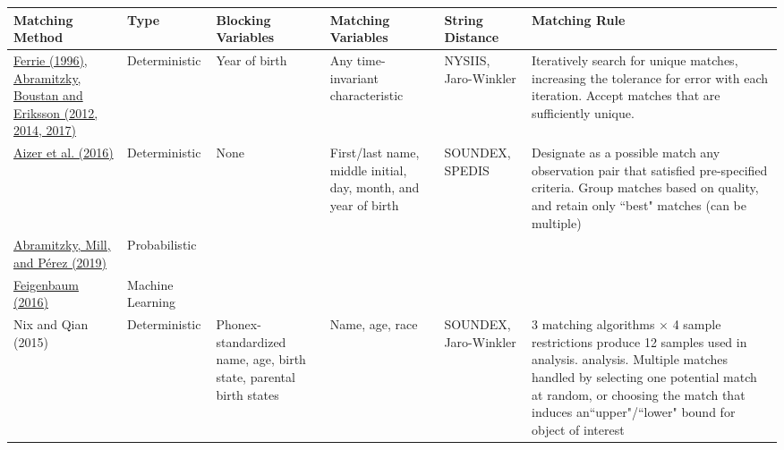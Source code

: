\documentclass[border=10pt]{standalone}
\begin{document}
\begin{tabular}{L{5.5cm}C{3cm}C{3.5cm}L{4cm}L{3.5cm}L{10cm}}
\toprule
\textbf{Matching Method} & \textbf{Type} &  \textbf{Blocking Variables} & \textbf{Matching Variables}  & \textbf{String Distance} &  \textbf{Matching Rule}\\
\midrule 
 \hyperlink{https://ranabr.people.stanford.edu/sites/g/files/sbiybj5391/f/abe_basic_approach_1.pdf}{Ferrie (1996), Abramitzky, Boustan and Eriksson (2012, 2014, 2017)}& Deterministic & Year of birth & Any time-invariant characteristic & NYSIIS, Jaro-Winkler & Iteratively search for unique matches, increasing the tolerance for error with each iteration. Accept matches that are sufficiently unique.   \\ \midrule
\hyperlink{https://assets.aeaweb.org/asset-server/articles-attachments/aer/app/10604/20140529_app.pdf}{Aizer et al. (2016)} & Deterministic & None & First/last name, middle initial, day, month, and year of birth & SOUNDEX, SPEDIS& Designate as a possible match any observation pair that satisfied pre-specified criteria.  Group matches based on quality, and retain only ``best" matches (can be multiple) \\
\midrule
\hyperlink{https://ranabr.people.stanford.edu/sites/g/files/sbiybj5391/f/matching_historicalmethod_march27.pdf}{Abramitzky, Mill, and P\'erez (2019)}  &   
Probabilistic &
&                   
&                   
&             \\
\midrule \hyperlink{https://jamesfeigenbaum.github.io/research/pdf/census-link-ml.pdf}{Feigenbaum (2016)} & Machine Learning 
\\
\midrule
Nix and Qian (2015) & Deterministic & Phonex-standardized name, age, birth state, parental birth states &  Name, age, race & SOUNDEX, Jaro-Winkler & 3 matching algorithms $\times$ 4 sample restrictions produce 12 samples used in analysis. analysis. Multiple matches handled by selecting one potential match at random, or choosing the match that induces an``upper"/``lower" bound for object of interest
\end{tabular}
\end{document}
